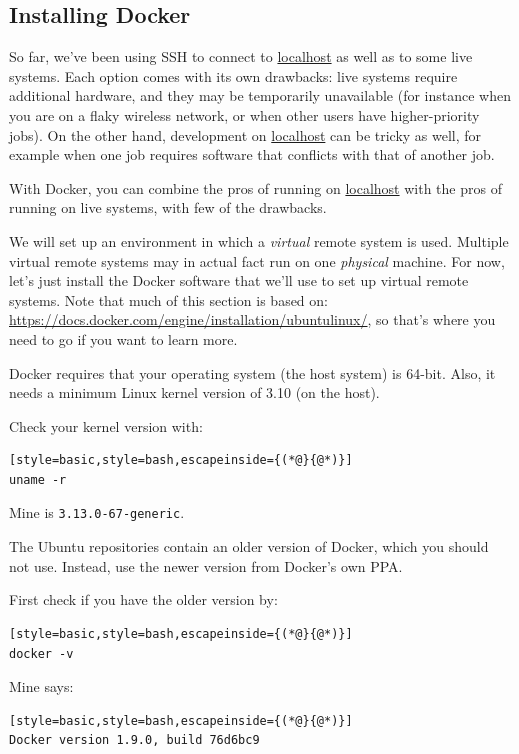 \documentclass[12pt, a4paper, twoside, openany, titlepage]{book}
\begin{document}
\subsection{Installing Docker}

\label{sec:docker}



So far, we've been using SSH to connect to \url{localhost} as well as to some live systems. Each option comes with its own drawbacks: live systems require additional hardware, and they may be temporarily unavailable (for instance when you are on a flaky wireless network, or when other users have higher-priority jobs). On the other hand, development on \url{localhost} can be tricky as well, for example when one job requires software that conflicts with that of another job.

With Docker, you can combine the pros of running on \url{localhost} with the pros of running on live systems, with few of the drawbacks.

We will set up an environment in which a \textit{virtual} remote system is used. Multiple virtual remote systems may in actual fact run on one \textit{physical} machine. For now, let's just install the Docker software that we'll use to set up virtual remote systems. Note that much of this section is based on: \url{https://docs.docker.com/engine/installation/ubuntulinux/}, so that's where you need to go if you want to learn more.

Docker requires that your operating system (the host system) is 64-bit. Also, it needs a minimum Linux kernel version of 3.10 (on the host).

Check your kernel version with:
\begin{lstlisting}[style=basic,style=bash,escapeinside={(*@}{@*)}]
uname -r
\end{lstlisting}
Mine is \texttt{3.13.0-67-generic}.

The Ubuntu repositories contain an older version of Docker, which you should not use. Instead, use the newer version from Docker's own PPA.

First check if you have the older version by:
\begin{lstlisting}[style=basic,style=bash,escapeinside={(*@}{@*)}]
docker -v
\end{lstlisting}
Mine says:
\begin{lstlisting}[style=basic,style=bash,escapeinside={(*@}{@*)}]
Docker version 1.9.0, build 76d6bc9
\end{lstlisting}
\end{document}

